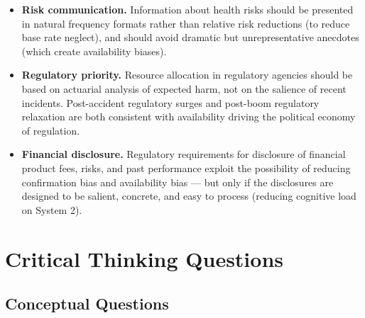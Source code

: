 \documentclass[12pt, letterpaper]{article}
\begin{document}
\begin{itemize}
\item \textbf{Risk communication.} Information about health risks should be presented in natural frequency formats rather than relative risk reductions (to reduce base rate neglect), and should avoid dramatic but unrepresentative anecdotes (which create availability biases).
\item \textbf{Regulatory priority.} Resource allocation in regulatory agencies should be based on actuarial analysis of expected harm, not on the salience of recent incidents. Post-accident regulatory surges and post-boom regulatory relaxation are both consistent with availability driving the political economy of regulation.
\item \textbf{Financial disclosure.} Regulatory requirements for disclosure of financial product fees, risks, and past performance exploit the possibility of reducing confirmation bias and availability bias --- but only if the disclosures are designed to be salient, concrete, and easy to process (reducing cognitive load on System 2).
\end{itemize}

\medskip


\section*{Critical Thinking Questions}



\subsection{Conceptual Questions}
\end{document}
